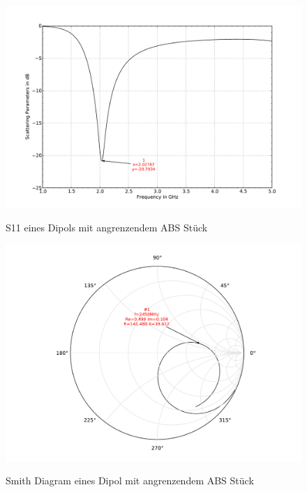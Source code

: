 \begin{figure}[!htb]
\begin{center}
  \includegraphics[width=\linewidth]{content/bilder/Evaluation/Dipol/S11DipolABS.pdf}
  \caption{S11 eines Dipols mit angrenzendem ABS Stück}\label{fig:S11_Dipol_ABS_3}
\endminipage%
{}
  \includegraphics[width=\linewidth]{content/bilder/Evaluation/Dipol/SmithDipolABS.pdf}
  \caption{Smith Diagram eines Dipol mit angrenzendem ABS Stück}\label{fig:Smith_Dipol_ABS_4}
\endminipage
\end{center}
\end{figure}


